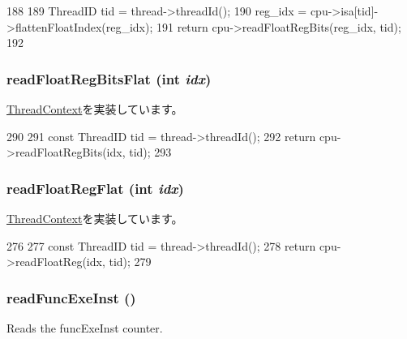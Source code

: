 \begin{DoxyCode}
188 {
189     ThreadID tid = thread->threadId();
190     reg_idx = cpu->isa[tid]->flattenFloatIndex(reg_idx);
191     return cpu->readFloatRegBits(reg_idx, tid);
192 }
\end{DoxyCode}
\hypertarget{classInOrderThreadContext_a2fa29585c9694c9bffcce2a63f871759}{
\subsubsection[{readFloatRegBitsFlat}]{ readFloatRegBitsFlat (int {\em idx})}}
\label{classInOrderThreadContext_a2fa29585c9694c9bffcce2a63f871759}


\hyperlink{classThreadContext_a3715f0deff5e4aeb64a8cf3ca293068b}{ThreadContext}を実装しています。


\begin{DoxyCode}
290 {
291     const ThreadID tid = thread->threadId();
292     return cpu->readFloatRegBits(idx, tid);
293 }
\end{DoxyCode}
\hypertarget{classInOrderThreadContext_aaa32dc9f4a8719a465c267fed47cbdc6}{
\subsubsection[{readFloatRegFlat}]{ readFloatRegFlat (int {\em idx})}}
\label{classInOrderThreadContext_aaa32dc9f4a8719a465c267fed47cbdc6}


\hyperlink{classThreadContext_a275e2481d9069a0ae8142fb7cc901cbf}{ThreadContext}を実装しています。


\begin{DoxyCode}
276 {
277     const ThreadID tid = thread->threadId();
278     return cpu->readFloatReg(idx, tid);
279 }
\end{DoxyCode}
\hypertarget{classInOrderThreadContext_a2b0bef6e1b1ac24e9322fbd09a511d11}{
\subsubsection[{readFuncExeInst}]{ readFuncExeInst ()}}
\label{classInOrderThreadContext_a2b0bef6e1b1ac24e9322fbd09a511d11}
Reads the funcExeInst counter. 

